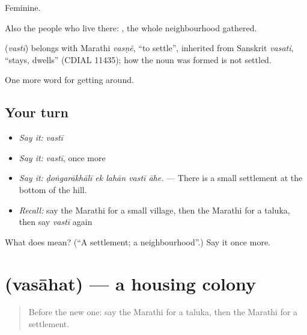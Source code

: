 Feminine.

Also the people who live there:   , the whole neighbourhood gathered.

\begin{cousinweb}
\textbf{} (\emph{vastī}) belongs with Marathi \emph{vasṇẽ}, \textquotedblleft{}to settle\textquotedblright{}, inherited from Sanskrit \emph{vasati}, \textquotedblleft{}stays, dwells\textquotedblright{} (CDIAL 11435); how the noun was formed is not settled.
\end{cousinweb}

\begin{grammarlens}[title={What you've built}]
One more word for getting around.
\end{grammarlens}

\subsection*{Your turn}
\begin{itemize}
\raggedright
  \item \emph{Say it:} \emph{vastī}
  \item \emph{Say it:} \emph{vastī}, once more
  \item \emph{Say it:} \emph{ḍoṅgarākhālī ek lahān vastī āhe.} — There is a small settlement at the bottom of the hill.
  \item \emph{Recall:} say the Marathi for a small village, then the Marathi for a taluka, then say \emph{vastī} again
\end{itemize}

\begin{tcolorbox}[breakable,colback=teal!4,colframe=teal!35!black,title={Before you move on}]
What does  mean? (\textquotedblleft{}A settlement; a neighbourhood\textquotedblright{}.) Say it once more.
\end{tcolorbox}
\section[\texorpdfstring{\mr{वसाहत} (vasāhat)}{वसाहत (vasāhat)}]{ (vasāhat) — a housing colony}

\label{lesson:MR-C419-vasahat}



\begin{quote}
Before the new one: say the Marathi for a taluka, then the Marathi for a settlement.
\end{quote}

